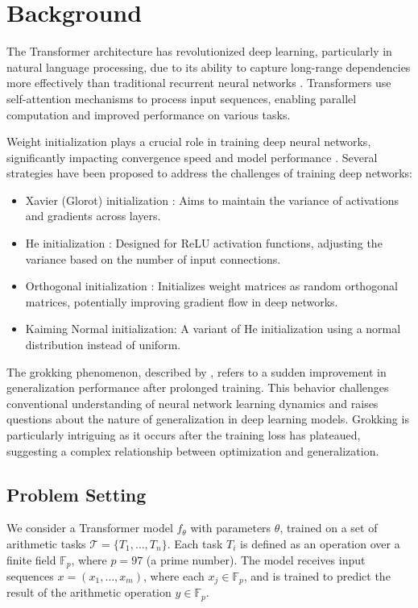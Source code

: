 \documentclass{article} %
\begin{document}
\section{Background}
\label{sec:background}

The Transformer architecture \cite{vaswani2017attention} has revolutionized deep learning, particularly in natural language processing, due to its ability to capture long-range dependencies more effectively than traditional recurrent neural networks \cite{bahdanau2014neural}. Transformers use self-attention mechanisms to process input sequences, enabling parallel computation and improved performance on various tasks.

Weight initialization plays a crucial role in training deep neural networks, significantly impacting convergence speed and model performance \cite{goodfellow2016deep}. Several strategies have been proposed to address the challenges of training deep networks:

\begin{itemize}
    \item Xavier (Glorot) initialization \cite{Glorot2010UnderstandingTD}: Aims to maintain the variance of activations and gradients across layers.
    \item He initialization \cite{He2015DelvingDI}: Designed for ReLU activation functions, adjusting the variance based on the number of input connections.
    \item Orthogonal initialization \cite{Saxe2013ExactST}: Initializes weight matrices as random orthogonal matrices, potentially improving gradient flow in deep networks.
    \item Kaiming Normal initialization: A variant of He initialization using a normal distribution instead of uniform.
\end{itemize}

The grokking phenomenon, described by \citet{power2022grokking}, refers to a sudden improvement in generalization performance after prolonged training. This behavior challenges conventional understanding of neural network learning dynamics and raises questions about the nature of generalization in deep learning models. Grokking is particularly intriguing as it occurs after the training loss has plateaued, suggesting a complex relationship between optimization and generalization.

\subsection{Problem Setting}
We consider a Transformer model $f_\theta$ with parameters $\theta$, trained on a set of arithmetic tasks $\mathcal{T} = \{T_1, \ldots, T_n\}$. Each task $T_i$ is defined as an operation over a finite field $\mathbb{F}_p$, where $p = 97$ (a prime number). The model receives input sequences $x = (x_1, \ldots, x_m)$, where each $x_j \in \mathbb{F}_p$, and is trained to predict the result of the arithmetic operation $y \in \mathbb{F}_p$.
\end{document}
